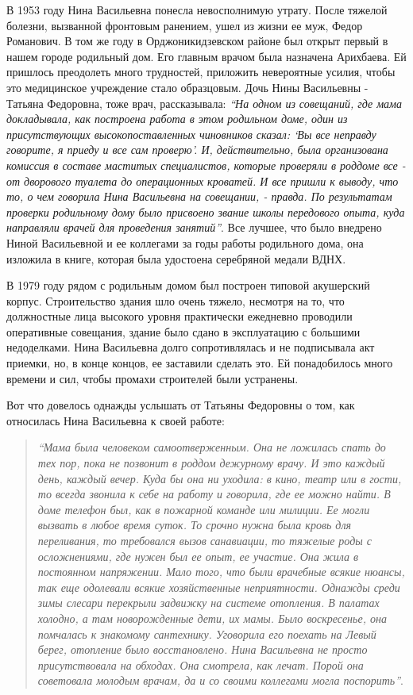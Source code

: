 В 1953 году Нина Васильевна понесла невосполнимую утрату. После тяжелой
болезни, вызванной фронтовым ранением, ушел из жизни ее муж, Федор Романович. В
том же году в Орджоникидзевском районе был открыт первый в нашем городе
родильный дом. Его главным врачом была назначена Арихбаева. Ей пришлось
преодолеть много трудностей, приложить невероятные усилия, чтобы это
медицинское учреждение стало образцовым. Дочь Нины Васильевны - Татьяна
Федоровна, тоже врач, рассказывала: \emph{\enquote{На одном из совещаний, где мама
докладывала, как построена работа в этом родильном доме, один из присутствующих
высокопоставленных чиновников сказал: \enquote{Вы все неправду говорите, я приеду и все
сам проверю}. И, действительно, была организована комиссия в составе маститых
специалистов, которые проверяли в роддоме все - от дворового туалета до
операционных кроватей. И все пришли к выводу, что то, о чем говорила Нина
Васильевна на совещании, - правда. По результатам проверки родильному дому было
присвоено звание школы передового опыта, куда направляли врачей для проведения
занятий}}. Все лучшее, что было внедрено Ниной Васильевной и ее коллегами за
годы работы родильного дома, она изложила в книге, которая была удостоена
серебряной медали ВДНХ.

В 1979 году рядом с родильным домом был построен типовой акушерский корпус.
Строительство здания шло очень тяжело, несмотря на то, что должностные лица
высокого уровня практически ежедневно проводили оперативные совещания, здание
было сдано в эксплуатацию с большими недоделками. Нина Васильевна долго
сопротивлялась и не подписывала акт приемки, но, в конце концов, ее заставили
сделать это. Ей понадобилось много времени и сил, чтобы промахи строителей были
устранены.

Вот что довелось однажды услышать от Татьяны Федоровны о том, как относилась
Нина Васильевна к своей работе: 

\begin{quote}
\emph{\enquote{Мама была человеком самоотверженным. Она не
ложилась спать до тех пор, пока не позвонит в роддом дежурному врачу. И это
каждый день, каждый вечер. Куда бы она ни уходила: в кино, театр или в гости,
то всегда звонила к себе на работу и говорила, где ее можно найти. В доме
телефон был, как в пожарной команде или милиции. Ее могли вызвать в любое время
суток. То срочно нужна была кровь для переливания, то требовался вызов
санавиации, то тяжелые роды с осложнениями, где нужен был ее опыт, ее участие.
Она жила в постоянном напряжении. Мало того, что были врачебные всякие нюансы,
так еще одолевали всякие хозяйственные неприятности. Однажды среди зимы слесари
перекрыли задвижку на системе отопления. В палатах холодно, а там новорожденные
дети, их мамы. Было воскресенье, она помчалась к знакомому сантехнику.
Уговорила его поехать на Левый берег, отопление было восстановлено. Нина
Васильевна не просто присутствовала на обходах. Она смотрела, как лечат. Порой
она советовала молодым врачам, да и со своими коллегами могла поспорить}}. 
\end{quote}

